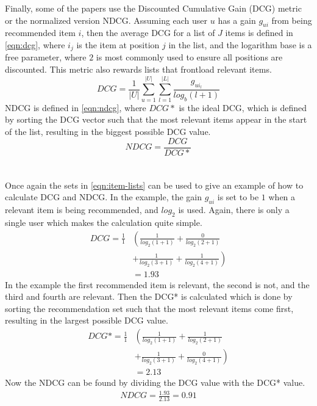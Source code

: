 Finally, some of the papers use the Discounted Cumulative Gain (DCG) metric or the normalized version NDCG.
Assuming each user $u$ has a gain $g_{ui}$ from being recommended item $i$, then the average DCG for a list of $J$ items is defined in \autoref{eqn:dcg}, where $i_j$ is the item at position $j$ in the list, and the logarithm base is a free parameter, where $2$ is most commonly used to ensure all positions are discounted.
This metric also rewards lists that frontload relevant items.
\begin{equation}
    \label{eqn:dcg}
    DCG = \frac{1}{|U|} \sum\limits_{u=1}^{|U|} \sum\limits_{l = 1}^{|L|} \frac{g_{ui_l}}{log_b (l+1)}
\end{equation}
NDCG is defined in \autoref{eqn:ndcg}, where $DCG*$ is the ideal DCG, which is defined by sorting the DCG vector such that the most relevant items appear in the start of the list\cite{dcgpaper}, resulting in the biggest possible DCG value.
\begin{equation}
    \label{eqn:ndcg}
    NDCG = \frac{DCG}{DCG*}
\end{equation}
\\\\
Once again the sets in \autoref{eqn:item-lists} can be used to give an example of how to calculate DCG and NDCG.
In the example, the gain $g_{ui}$ is set to be $1$ when a relevant item is being recommended, and $log_2$ is used.
Again, there is only a single user which makes the calculation quite simple.
\begin{align*}
    DCG = \frac{1}{1} &\left (\frac{1}{log_2 (1+1)} + \frac{0}{log_2 (2+1)} \right.\\
    & \left.+ \frac{1}{log_2 (3+1)} + \frac{1}{log_2 (4+1)}\right) \\
    & = 1.93
\end{align*}
In the example the first recommended item is relevant, the second is not, and the third and fourth are relevant.
Then the DCG* is calculated which is done by sorting the recommendation set such that the most relevant items come first, resulting in the largest possible DCG value.
\begin{align*}
    DCG* = \frac{1}{1} &\left (\frac{1}{log_2 (1+1)} + \frac{1}{log_2 (2+1)} \right.\\
    & \left.+ \frac{1}{log_2 (3+1)} + \frac{0}{log_2 (4+1)}\right) \\
    & = 2.13
\end{align*}
Now the NDCG can be found by dividing the DCG value with the DCG* value.
\begin{align*}
    NDCG = \frac{1.93}{2.13} = 0.91
\end{align*}
